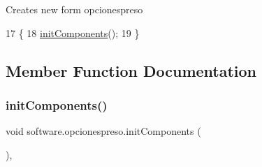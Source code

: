 Creates new form opcionespreso 
\begin{DoxyCode}
17                            \{
18         \mbox{\hyperlink{classsoftware_1_1opcionespreso_a6bc69bb840871d48ada42e019670b660}{initComponents}}();
19     \}
\end{DoxyCode}


\subsection{Member Function Documentation}
\mbox{\label{classsoftware_1_1opcionespreso_a6bc69bb840871d48ada42e019670b660}} 
\subsubsection{\texorpdfstring{init\+Components()}{initComponents()}}
{\footnotesize\ttfamily void software.\+opcionespreso.\+init\+Components (\begin{DoxyParamCaption}{ }\end{DoxyParamCaption})\hspace{0.3cm}{\ttfamily [inline]}, {\ttfamily [private]}}

